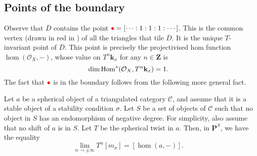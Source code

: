 \documentclass{amsart}
\begin{document}
\subsection{Points of the boundary}\label{sec:boundary}
Observe that \(\overline D\) contains the point \(\textcolor{red}{\bullet} = [\cdots :1:1:1: \cdots]\).
This is the common vertex (drawn in red in ) of all the triangles that tile \(\overline D\).
It is the unique \(T\)-invariant point of \(\overline D\).
This point is precisely the projectivised hom function \(\hom(\mathcal{O}_X,-)\), whose value on \(T^n \mathbf{k}_x\) for any \(n \in \mathbf{Z}\) is
\[ \dim \operatorname{Hom}^{*}(\mathcal{O}_{X}, T^n\mathbf{k}_x) = 1.\]
The fact that \(\textcolor{red}{\bullet}\) is in the boundary follows from the following more general fact.
\begin{theorem}
  \label{thm:qhom}
  Let \(a\) be a spherical object of a triangulated category \(\mathcal{C}\), and assume that it is a stable object of a stability condition \(\sigma\).
  Let \(S\) be a set of objects of \(\mathcal{C}\) such that no object in \(S\) has an endomorphism of negative degree.
  For simplicity, also assume that no shift of \(a\) is in \(S\).
  Let \(T\) be the spherical twist in \(a\).
  Then, in \(\mathbf{P}^S\), we have the equality
  \[\lim_{n \to \pm \infty} T^n[m_{\sigma}] = [ \hom(a,-)].\]
\end{theorem}
\end{document}
